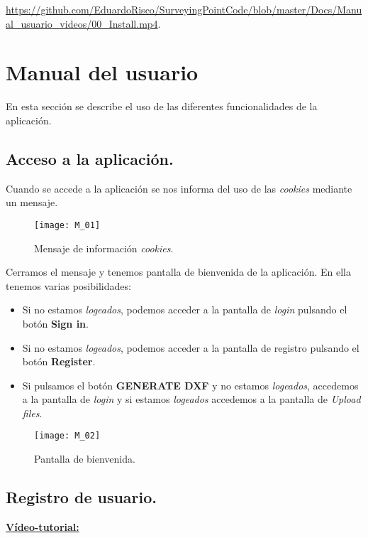 \url{https://github.com/EduardoRisco/SurveyingPointCode/blob/master/Docs/Manual_usuario_videos/00_Install.mp4}.

\section{Manual del usuario}

En esta sección se describe el uso de las diferentes funcionalidades de la aplicación.
\subsection{Acceso a la aplicación.}
Cuando se accede a la aplicación se nos informa del uso de las \emph{cookies} mediante un mensaje. 

\begin{figure}[H]
	\centering
	\texttt{[image: M\_01]}
	\caption{Mensaje de información \emph{cookies}.}
	\label{fig:M_01}
\end{figure}

Cerramos el mensaje y tenemos pantalla de bienvenida de la aplicación. En ella tenemos varias posibilidades:

\begin{itemize}
\item Si no estamos \emph{logeados}, podemos acceder a la pantalla de  \emph{login} pulsando el botón \textbf{Sign in}.
\item Si no estamos \emph{logeados}, podemos acceder a la pantalla de  registro pulsando el botón \textbf{Register}.
\item Si pulsamos el botón \textbf{GENERATE DXF} y no estamos \emph{logeados}, accedemos a la pantalla de \emph{login} y si estamos   \emph{logeados} accedemos a la pantalla de \emph{Upload files}.

\end{itemize}

\begin{figure}
	\centering
	\texttt{[image: M\_02]}
	\caption{Pantalla de bienvenida.}
	\label{fig:M_02}
\end{figure}

\newpage

\subsection{Registro de usuario.}

\textbf{\underline{Vídeo-tutorial:}}

